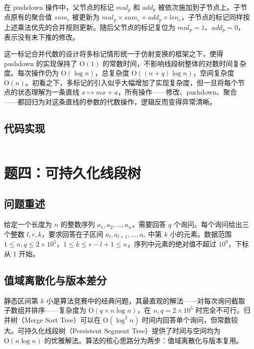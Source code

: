 \documentclass[12pt, a4paper]{academics}
\begin{document}
在 pushdown 操作中，父节点的标记 $\mathit{mul}_p$ 和 $\mathit{add}_p$ 被依次施加到子节点上。子节点原有的聚合值 $\mathit{sum}_c$ 被更新为 $\mathit{mul}_p \times \mathit{sum}_c + \mathit{add}_p \times \mathit{len}_c$，子节点的标记同样按上述乘法优先的合并规则更新。随后父节点的标记复位为 $\mathit{mul}_p = 1$、$\mathit{add}_p = 0$，表示没有未下推的修改。

这一标记合并代数的设计将多标记情形统一于仿射变换的框架之下，使得 pushdown 的实现保持了 $\mathrm{O}(1)$ 的常数时间，不影响线段树整体的对数时间复杂度。每次操作仍为 $\mathrm{O}(\log n)$，总复杂度 $\mathrm{O}((n + q) \log n)$，空间复杂度 $\mathrm{O}(n)$。初看之下，多标记的引入似乎大幅增加了实现复杂度，但一旦将每个节点的状态理解为一条直线 $x \mapsto mx + a$，所有操作——修改、pushdown、聚合——都回归为对这条直线的参数的代数操作，逻辑反而变得异常清晰。

\subsection{代码实现}

\inputminted{c++}{../src/p3_segtree_multitag.cpp}

\section{题四：可持久化线段树}

\subsection{问题重述}

给定一个长度为 $n$ 的整数序列 $a_1, a_2, \dots, a_n$，需要回答 $q$ 个询问。每个询问给出三个整数 $l, r, k$，要求回答在子区间 $a_l, a_{l+1}, \dots, a_r$ 中第 $k$ 小的元素。数据范围 $1 \le n, q \le 2 \times 10^5$，$1 \le k \le r - l + 1 \le n$，序列中元素的绝对值不超过 $10^9$，下标从 $1$ 开始。

\subsection{值域离散化与版本差分}

静态区间第 $k$ 小是算法竞赛中的经典问题，其最直观的解法——对每次询问截取子数组并排序——复杂度为 $\mathrm{O}(q \times n \log n)$，在 $n, q = 2 \times 10^5$ 时完全不可行。归并树（Merge Sort Tree）可以在 $\mathrm{O}(\log^2 n)$ 时间内回答单个询问，但常数较大。可持久化线段树（Persistent Segment Tree）提供了时间与空间均为 $\mathrm{O}(n \log n)$ 的优雅解法。算法的核心思路分为两步：值域离散化与版本复用。
\end{document}
